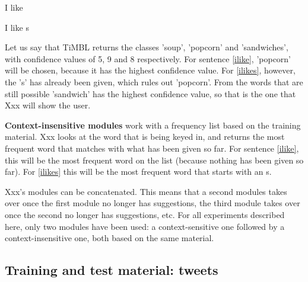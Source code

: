 \documentclass[11pt]{article}
\begin{document}
\begin{examples}
\item I like \label{ilike}
\item I like s \label{ilikes}
\end{examples}

Let us say that TiMBL returns the classes 'soup', 'popcorn' and 'sandwiches', with confidence values of 5, 9 and 8 respectively. For sentence \ref{ilike}, 'popcorn' will be chosen, because it has the highest confidence value. For \ref{ilikes}, however, the 's' has already been given, which rules out 'popcorn'. From the words that are still possible 'sandwich' has the highest confidence value, so that is the one that Xxx will show the user.

\textbf{Context-insensitive modules} work with a frequency list based on the training material. Xxx looks at the word that is being keyed in, and returns the most frequent word that matches with what has been given so far. For sentence \ref{ilike}, this will be the most frequent word on the list (because nothing has been given so far). For \ref{ilikes} this will be the most frequent word that starts with an s.

Xxx's modules can be concatenated. This means that a second modules takes over once the first module no longer has suggestions, the third module takes over once the second no longer has suggestions, etc. For all experiments described here, only two modules have been used: a context-sensitive one followed by a context-insensitive one, both based on the same material.

\subsection{Training and test material: tweets}

\end{document}
